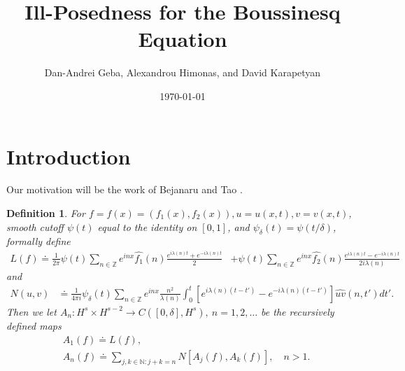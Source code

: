 \documentclass[12pt,reqno]{amsart}
\numberwithin{equation}{section}  %
\newcommand{\zz}{\mathbb{Z}}
\newcommand{\wh}{\widehat}
\newtheorem{definition}[theorem]{Definition}
\begin{document}
\title{Ill-Posedness for the Boussinesq Equation}
\author{Dan-Andrei Geba, Alexandrou Himonas, and David Karapetyan}
\address{Department of Mathematics, University of Rochester, Rochester, NY 14627}
\address{Department of Mathematics, University of Notre Dame, Notre Dame, IN 46556}
\address{Department of Mathematics, University of Notre Dame, Notre Dame, IN 46556}
\date{\today}
%
%
\maketitle
%
%
%
%
%
%
%
%
%
%
%
%
\section{Introduction}
Our motivation will be the work of Bejanaru and Tao
\cite{Bejenaru-Tao-2006-Sharp-well-posedness-and-ill-posedness}. 
%
\begin{definition}
  For $f =f(x)= (f_{1}(x), f_{2}(x)), u = u(x,t), v = v(x,t)$, smooth cutoff $\psi(t)$ equal to the identity on $[0, 1]$, and $\psi_{\delta}(t) = \psi(t/\delta)$, formally define 
%
%
\begin{equation*}
\begin{split}
  L(f)
  \doteq \frac{1}{2 \pi} \psi(t) \sum_{n \in \zz} e^{inx}
  \wh{f_{1}}(n) \frac{e^{i\lambda(n)t} + e^{-i\lambda(n)t}}{2} 
  & + \psi(t) \sum_{n \in \zz} e^{inx}
  \wh{f_{2}}(n)\frac{e^{i\lambda(n)t} - e^{-i\lambda(n)t}}{2 i \lambda(n)} 
\end{split}
\end{equation*}
%
%
and
%
%
\begin{equation*}
\begin{split}
N(u, v)
& \doteq \frac{1}{4 \pi i} \psi_{\delta}(t) \sum_{n \in \zz} e^{inx} \frac{n^{2}}{\lambda(n)}
    \int_{0}^{t}[e^{i\lambda(n)(t-t')}-e^{-i\lambda(n)(t-t')}]
    \wh{uv}(n, t') dt'.
\end{split}
\end{equation*}
%
%
Then we let $A_{n}: H^{s} \times H^{s-2} \to C([0, \delta], H^{s}), \ n = 1, 2, \dots$ be the
recursively defined maps
%
%
\begin{equation*}
\begin{split}
  & A_{1}(f) \doteq L(f),
  \\
  & A_{n}(f) \doteq \sum_{j, k \in \mathbb{N}: j + k = n} N\left[
  A_{j}(f), A_{k}(f) \right], \quad n > 1.
\end{split}
\end{equation*}
\end{definition}
\end{document}

